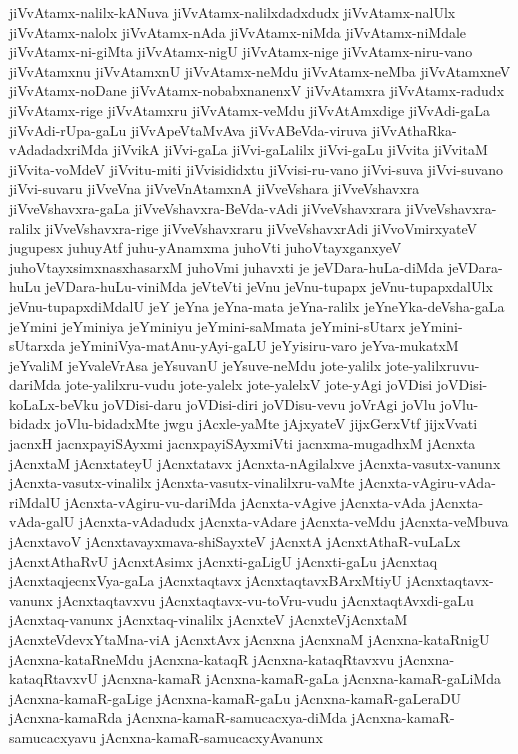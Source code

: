{jiVvAtamx-nalilx-kANuva
jiVvAtamx-nalilxdadxdudx
jiVvAtamx-nalUlx
jiVvAtamx-nalolx
jiVvAtamx-nAda
jiVvAtamx-niMda
jiVvAtamx-niMdale
jiVvAtamx-ni-giMta
jiVvAtamx-nigU
jiVvAtamx-nige
jiVvAtamx-niru-vano
jiVvAtamxnu
jiVvAtamxnU
jiVvAtamx-neMdu
jiVvAtamx-neMba
jiVvAtamxneV
jiVvAtamx-noDane
jiVvAtamx-nobabxnanenxV
jiVvAtamxra
jiVvAtamx-radudx
jiVvAtamx-rige
jiVvAtamxru
jiVvAtamx-veMdu
jiVvAtAmxdige
jiVvAdi-gaLa
jiVvAdi-rUpa-gaLu
jiVvApeVtaMvAva
jiVvABeVda-viruva
jiVvAthaRka-vAdadadxriMda
jiVvikA
jiVvi-gaLa
jiVvi-gaLalilx
jiVvi-gaLu
jiVvita
jiVvitaM
jiVvita-voMdeV
jiVvitu-miti
jiVvisididxtu
jiVvisi-ru-vano
jiVvi-suva
jiVvi-suvano
jiVvi-suvaru
jiVveVna
jiVveVnAtamxnA
jiVveVshara
jiVveVshavxra
jiVveVshavxra-gaLa
jiVveVshavxra-BeVda-vAdi
jiVveVshavxrara
jiVveVshavxra-ralilx
jiVveVshavxra-rige
jiVveVshavxraru
jiVveVshavxrAdi
jiVvoVmirxyateV
jugupesx
juhuyAtf
juhu-yAnamxma
juhoVti
juhoVtayxganxyeV
juhoVtayxsimxnasxhasarxM
juhoVmi
juhavxti
je
jeVDara-huLa-diMda
jeVDara-huLu
jeVDara-huLu-viniMda
jeVteVti
jeVnu
jeVnu-tupapx
jeVnu-tupapxdalUlx
jeVnu-tupapxdiMdalU
jeY
jeYna
jeYna-mata
jeYna-ralilx
jeYneYka-deVsha-gaLa
jeYmini
jeYminiya
jeYminiyu
jeYmini-saMmata
jeYmini-sUtarx
jeYmini-sUtarxda
jeYminiVya-matAnu-yAyi-gaLU
jeYyisiru-varo
jeYva-mukatxM
jeYvaliM
jeYvaleVrAsa
jeYsuvanU
jeYsuve-neMdu
jote-yalilx
jote-yalilxruvu-dariMda
jote-yalilxru-vudu
jote-yalelx
jote-yalelxV
jote-yAgi
joVDisi
joVDisi-koLaLx-beVku
joVDisi-daru
joVDisi-diri
joVDisu-vevu
joVrAgi
joVlu
joVlu-bidadx
joVlu-bidadxMte
jwgu
jAcxle-yaMte
jAjxyateV
jijxGerxVtf
jijxVvati
jacnxH
jacnxpayiSAyxmi
jacnxpayiSAyxmiVti
jacnxma-mugadhxM
jAcnxta
jAcnxtaM
jAcnxtateyU
jAcnxtatavx
jAcnxta-nAgilalxve
jAcnxta-vasutx-vanunx
jAcnxta-vasutx-vinalilx
jAcnxta-vasutx-vinalilxru-vaMte
jAcnxta-vAgiru-vAda-riMdalU
jAcnxta-vAgiru-vu-dariMda
jAcnxta-vAgive
jAcnxta-vAda
jAcnxta-vAda-galU
jAcnxta-vAdadudx
jAcnxta-vAdare
jAcnxta-veMdu
jAcnxta-veMbuva
jAcnxtavoV
jAcnxtavayxmava-shiSayxteV
jAcnxtA
jAcnxtAthaR-vuLaLx
jAcnxtAthaRvU
jAcnxtAsimx
jAcnxti-gaLigU
jAcnxti-gaLu
jAcnxtaq
jAcnxtaqjecnxVya-gaLa
jAcnxtaqtavx
jAcnxtaqtavxBArxMtiyU
jAcnxtaqtavx-vanunx
jAcnxtaqtavxvu
jAcnxtaqtavx-vu-toVru-vudu
jAcnxtaqtAvxdi-gaLu
jAcnxtaq-vanunx
jAcnxtaq-vinalilx
jAcnxteV
jAcnxteVjAcnxtaM
jAcnxteVdevxYtaMna-viA
jAcnxtAvx
jAcnxna
jAcnxnaM
jAcnxna-kataRnigU
jAcnxna-kataRneMdu
jAcnxna-kataqR
jAcnxna-kataqRtavxvu
jAcnxna-kataqRtavxvU
jAcnxna-kamaR
jAcnxna-kamaR-gaLa
jAcnxna-kamaR-gaLiMda
jAcnxna-kamaR-gaLige
jAcnxna-kamaR-gaLu
jAcnxna-kamaR-gaLeraDU
jAcnxna-kamaRda
jAcnxna-kamaR-samucacxya-diMda
jAcnxna-kamaR-samucacxyavu
jAcnxna-kamaR-samucacxyAvanunx
}
